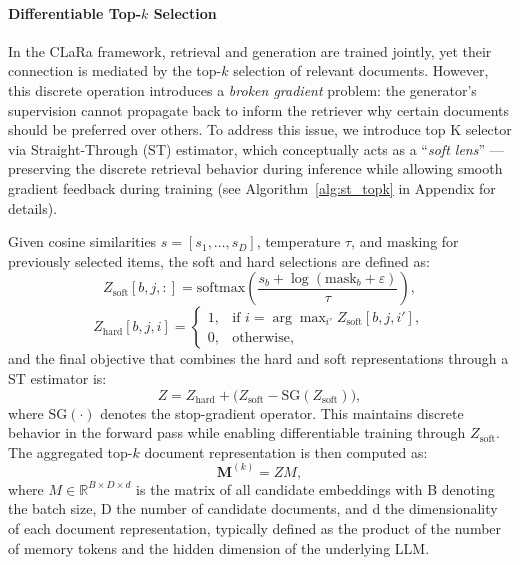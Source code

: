 \documentclass{applemlr}
\numberwithin{equation}{section}
\begin{document}
\paragraph{Differentiable Top-\texorpdfstring{$k$}{k} Selection}
In the CLaRa framework, retrieval and generation are trained jointly, yet their connection is mediated by the top-$k$ selection of relevant documents.  
However, this discrete operation introduces a \textit{broken gradient} problem: the generator’s supervision cannot propagate back to inform the retriever why certain documents should be preferred over others.  
To address this issue, we introduce top K selector via Straight-Through (ST) estimator, which conceptually acts as a ``\textit{soft lens}'' — preserving the discrete retrieval behavior during inference while allowing smooth gradient feedback during training (see Algorithm~\ref{alg:st_topk} in Appendix for details).  


Given cosine similarities $s = [s_1, \dots, s_D]$, temperature $\tau$, and masking for previously selected items, the soft and hard selections are defined as:
\begin{equation}
Z_{\text{soft}}[b,j,:] =
\mathrm{softmax}\!\left(
\frac{s_b + \log(\mathrm{mask}_b + \varepsilon)}{\tau}
\right),
\label{eq:soft}
\end{equation}
\begin{equation}
Z_{\text{hard}}[b,j,i] =
\begin{cases}
1, & \text{if } i = \arg\max\nolimits_{i'} Z_{\text{soft}}[b,j,i'], \\
0, & \text{otherwise},
\end{cases}
\label{eq:hard}
\end{equation}
and the final objective that combines the hard and soft representations through a ST estimator is:
\begin{equation}
Z = Z_{\text{hard}} + \big(Z_{\text{soft}} - \mathrm{SG}(Z_{\text{soft}})\big),
\label{eq:st}
\end{equation}
where $\mathrm{SG}(\cdot)$ denotes the stop-gradient operator.  
This maintains discrete behavior in the forward pass while enabling differentiable training through $Z_{\text{soft}}$.  
The aggregated top-$k$ document representation is then computed as:
\begin{equation}
\mathbf{M}^{(k)} = Z M,
\label{eq:topk}
\end{equation}
where $M \in \mathbb{R}^{B\times D\times d}$ is the matrix of all candidate embeddings with B denoting the batch size, D the number of candidate documents,
and d the dimensionality of each document representation, typically defined as
the product of the number of memory tokens and the hidden dimension of the underlying LLM.
\end{document}
